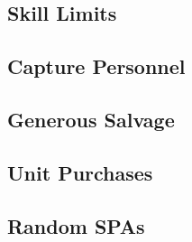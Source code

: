 

\subsection{Skill Limits}



\subsection{Capture Personnel}



\subsection{Generous Salvage}



\subsection{Unit Purchases}



\newpage

\subsection{Random SPAs}



\newpage

